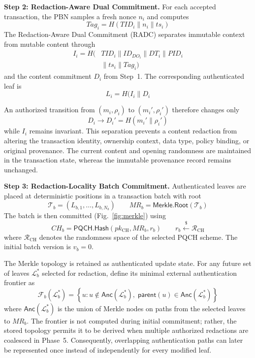 \documentclass[lettersize,journal]{IEEEtran}
\begin{document}
\medskip
\noindent\textbf{Step 2: Redaction-Aware Dual Commitment.}
For each accepted transaction, the PBN samples a fresh nonce $n_i$ and
computes
\begin{equation}
Tag_i=H(TID_i\parallel n_i\parallel ts_i)
\end{equation}
The Redaction-Aware Dual Commitment (RADC) separates immutable context
from mutable content through
\begin{equation}
\begin{aligned}
I_i=H(&TID_i\parallel ID_{DO_i}\parallel DT_i
\parallel PID_i\\
&\parallel ts_i\parallel Tag_i)
\end{aligned}
\end{equation}
and the content commitment $D_i$ from Step~1. The corresponding
authenticated leaf is
\begin{equation}
L_i=H(I_i\parallel D_i
\end{equation}

An authorized transition from $(m_i,\rho_i)$ to
$(m_i',\rho_i')$ therefore changes only
\begin{equation}
D_i\rightarrow D_i'=H(m_i'\parallel\rho_i')
\end{equation}
while $I_i$ remains invariant. This separation prevents a content
redaction from altering the transaction identity, ownership context,
data type, policy binding, or original provenance. The current content
and opening randomness are maintained in the transaction state, whereas
the immutable provenance record remains unchanged.

\medskip
\noindent\textbf{Step 3: Redaction-Locality Batch Commitment.}
Authenticated leaves are placed at deterministic positions in a
transaction batch with root
\begin{equation}
\mathcal{T}_b=(L_{b,1},\ldots,L_{b,N_b})\qquad
MR_b=\mathsf{Merkle.Root}(\mathcal{T}_b)
\end{equation}
The batch is then committed (Fig.~\ref{fig:merkle}) using
\begin{equation}
CH_b=
\mathsf{PQCH.Hash}(pk_{\mathrm{CH}},MR_b,r_b)
\qquad
r_b\stackrel{\$}{\leftarrow}\mathcal{R}_{\mathrm{CH}}
\end{equation}
where $\mathcal{R}_{\mathrm{CH}}$ denotes the randomness space of the
selected PQCH scheme. The initial batch version is $v_b=0$.

The Merkle topology is retained as authenticated update state. For any
future set of leaves $\mathcal{L}_b^{*}$ selected for redaction, define
its minimal external authentication frontier as
\begin{equation}
\mathcal{F}_b(\mathcal{L}_b^{*})
=
\left\{
u:
u\notin\mathsf{Anc}(\mathcal{L}_b^{*}),
\;
\mathsf{parent}(u)\in
\mathsf{Anc}(\mathcal{L}_b^{*})
\right\}
\end{equation}
where $\mathsf{Anc}(\mathcal{L}_b^{*})$ is the union of Merkle nodes on
paths from the selected leaves to $MR_b$. The frontier is not computed
during initial commitment; rather, the stored topology permits it to be
derived when multiple authorized redactions are coalesced in Phase~5.
Consequently, overlapping authentication paths can later be represented
once instead of independently for every modified leaf.
\end{document}
